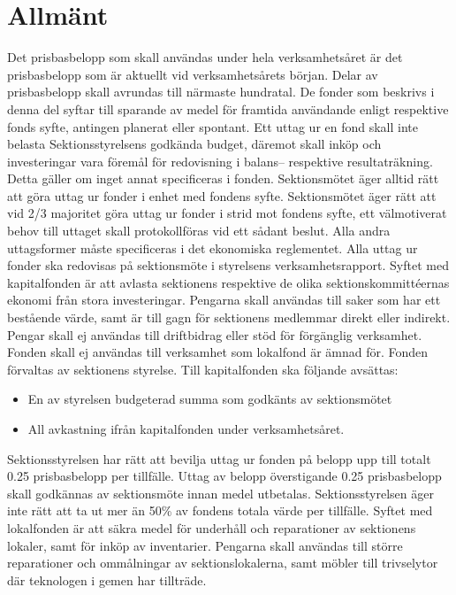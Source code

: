 \documentclass[a4paper]{dtek}
\newcommand{\prisbasbelopp}[1]{
    #1 prisbasbelopp
    \ifdef{\nuvarandeprisbasbelopp}{
        \marginpar{
            \small{ \textbf{\roundandprint{\xintiexpr#1 * \nuvarandeprisbasbelopp\relax}kr}}
        }
    }{}
}
\begin{document}
\section{Allmänt}
\para[Ekonomi] Det prisbasbelopp som skall användas under hela verksamhetsåret är det prisbasbelopp som är aktuellt vid verksamhetsårets början.
\para Delar av prisbasbelopp skall avrundas till närmaste hundratal.
\para De fonder som beskrivs i denna del syftar till sparande av medel för framtida användande enligt respektive fonds syfte, antingen planerat eller spontant. Ett uttag ur en fond skall inte belasta Sektionsstyrelsens godkända budget, däremot skall inköp och investeringar vara föremål för redovisning i balans– respektive resultaträkning. Detta gäller om inget annat specificeras i fonden.
\para Sektionsmötet äger alltid rätt att göra uttag ur fonder i enhet med fondens syfte. Sektionsmötet äger rätt att vid 2/3 majoritet göra uttag ur fonder i strid mot fondens syfte, ett välmotiverat behov till uttaget skall protokollföras vid ett sådant beslut. Alla andra uttagsformer måste specificeras i det ekonomiska reglementet.
\para Alla uttag ur fonder ska redovisas på sektionsmöte i styrelsens verksamhetsrapport.
\para[Kapitalfonden] Syftet med kapitalfonden är att avlasta sektionens respektive de olika sektionskommittéernas ekonomi från stora investeringar. Pengarna skall användas till saker som har ett bestående värde, samt är till gagn för sektionens medlemmar direkt eller indirekt. Pengar skall ej användas till driftbidrag eller stöd för förgänglig verksamhet. Fonden skall ej användas till verksamhet som lokalfond är ämnad för.
\para Fonden förvaltas av sektionens styrelse.
\para Till kapitalfonden ska följande avsättas:
\begin{itemize}
\item En av styrelsen budgeterad summa som godkänts av sektionsmötet
\item All avkastning ifrån kapitalfonden under verksamhetsåret.
\end{itemize}
\para Sektionsstyrelsen har rätt att bevilja uttag ur fonden på belopp upp till totalt \prisbasbelopp{0.25} per tillfälle. Uttag av belopp överstigande \prisbasbelopp{0.25} skall godkännas av sektionsmöte innan medel utbetalas.
\para Sektionsstyrelsen äger inte rätt att ta ut mer än 50\% av fondens totala värde per tillfälle.
\para[Lokalfonden] Syftet med lokalfonden är att säkra medel för underhåll och reparationer av sektionens lokaler, samt för inköp av inventarier. Pengarna skall användas till större reparationer och ommålningar av sektionslokalerna, samt möbler till trivselytor där teknologen i gemen har tillträde.
\end{document}
